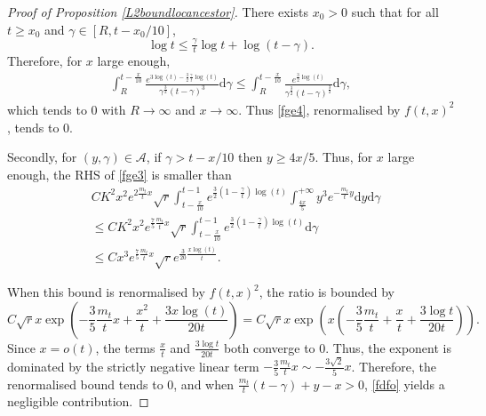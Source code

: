 \documentclass[10pt,a4paper]{amsart}
\begin{document}
\begin{proof}[Proof of Proposition \ref{L2boundlocancestor}]
There exists \( x_0 > 0 \) such that for all \( t \geq x_0 \) and \( \gamma \in [R, t - x_0/10] \),
\begin{equation*}
    \log t \leq \tfrac{\gamma}{t}\log t + \log(t - \gamma).
\end{equation*}
Therefore, for $x$ large enough,
\begin{equation}
    \begin{split}
         \int_R^{t-\frac{x}{10}} \frac{e^{3\log(t)-\frac{3}{2}\frac{\gamma}{t}\log(t)}}{\gamma^{\frac{3}{2}}(t-\gamma)^{3}}\mathrm{d}\gamma\leq \int_R^{t-\frac{x}{10}} \frac{e^{\frac{3}{2}\log(t)}}{\gamma^{\frac{3}{2}}(t-\gamma)^{\frac{3}{2}}}\mathrm{d}\gamma,
    \end{split}
\end{equation}
which tends to 0 with $R\to \infty$ and $x\to \infty$.
Thus \eqref{fge4}, renormalised by $f(t,x)^2$, tends to $0$.


 Secondly, for $(y, \gamma) \in \mathcal{A}$, if $\gamma > t - x/10$ then $y \geq 4x/5$. Thus, for $x$ large enough, the RHS of \eqref{fge3} is smaller than
\begin{equation}
\begin{split}
        & CK^2 x^2e^{2\frac{m_t}{t}x}\sqrt{r}\int_{t-\frac{x}{10}}^{t-1} e^{\frac{3}{2}(1-\frac{\gamma}{t})\log(t)}\int_{\frac{4x}{5}}^{+\infty}y^3e^{-\frac{m_t}{t}y}\mathrm{d}y\mathrm{d}\gamma\\
        & \leq C K^2 x^2e^{\frac{7}{5}\frac{m_t}{t}x}\sqrt{r}\int_{t-\frac{x}{10}}^{t-1} e^{\frac{3}{2}(1-\frac{\gamma}{t})\log(t)}\mathrm{d}\gamma\\
        &\leq Cx^3e^{\frac{7}{5}\frac{m_t}{t}x}\sqrt{r}e^{\frac{3}{20}\frac{x\log(t)}{t}}.
\end{split}
\end{equation}

When this bound is renormalised by $f(t,x)^2$, the ratio is bounded by
\begin{equation*}
    C \sqrt{r} x \exp\left( -\frac{3}{5}\frac{m_t}{t}x + \frac{x^2}{t} + \frac{3x\log(t)}{20 t} \right) = C \sqrt{r} x \exp\left( x\left( -\frac{3}{5}\frac{m_t}{t} + \frac{x}{t} + \frac{3\log t}{20 t} \right) \right).
\end{equation*}
Since $x = o(t)$, the terms $\frac{x}{t}$ and $\frac{3\log t}{20 t}$ both converge to $0$. Thus, the exponent is dominated by the strictly negative linear term $-\frac{3}{5}\frac{m_t}{t}x \sim -\frac{3\sqrt{2}}{5}x$. Therefore, the renormalised bound tends to $0$, and when $\frac{m_t}{t}(t-\gamma) +y -x > 0$, \eqref{fdfo} yields a negligible contribution.
\end{proof}
\end{document}
